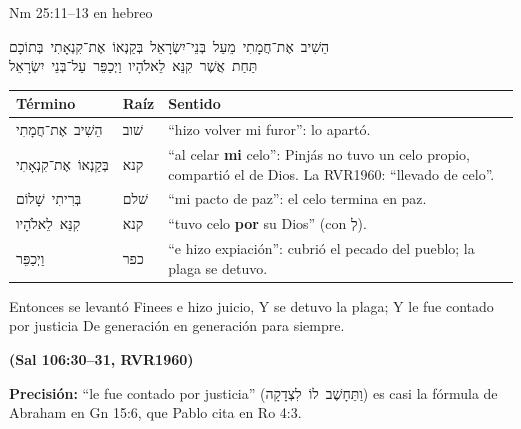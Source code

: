 \documentclass[hyperref={bookmarks=false},aspectratio=169]{beamer}
\newcommand{\heb}[1]{\mbox{\foreignlanguage{hebrew}{#1}}}
\newcommand{\fuente}[1]{\par\hfill{\upshape\bfseries\footnotesize\textcolor{azul}{#1}}}
\newcommand{\destacar}[1]{\textbf{\textcolor{azul}{#1}}}
\newcommand{\precision}[1]{{\footnotesize\color{gris}\textbf{Precisión:} #1}}
\begin{document}
\begin{frame}{Nm 25:11--13 en hebreo}
\begin{center}\heb{הֵשִׁיב אֶת־חֲמָתִי מֵעַל בְּנֵי־יִשְׂרָאֵל בְּקַנְאוֹ אֶת־קִנְאָתִי בְּתוֹכָם}\\[2pt]\heb{תַּחַת אֲשֶׁר קִנֵּא לֵאלֹהָיו וַיְכַפֵּר עַל־בְּנֵי יִשְׂרָאֵל}\end{center}
\scriptsize\renewcommand{\arraystretch}{1.13}
\begin{tabular}{@{}>{\RaggedRight\arraybackslash}p{3.1cm}>{\RaggedRight\arraybackslash}p{1.1cm}>{\RaggedRight\arraybackslash}p{7.6cm}@{}}
\toprule
\textbf{Término} & \textbf{Raíz} & \textbf{Sentido} \\ \midrule
\heb{הֵשִׁיב אֶת־חֲמָתִי} & \heb{שׁוב} & ``hizo volver mi furor'': lo apartó. \\
\heb{בְּקַנְאוֹ אֶת־קִנְאָתִי} & \heb{קנא} & ``al celar \destacar{mi} celo'': Pinjás no tuvo un celo propio, compartió el de Dios. La RVR1960: ``llevado de celo''. \\
\heb{בְּרִיתִי שָׁלוֹם} & \heb{שׁלם} & ``mi pacto de paz'': el celo termina en paz. \\
\heb{קִנֵּא לֵאלֹהָיו} & \heb{קנא} & ``tuvo celo \destacar{por} su Dios'' (con \heb{לְ}). \\
\heb{וַיְכַפֵּר} & \heb{כפר} & ``e hizo expiación'': cubrió el pecado del pueblo; la plaga se detuvo. \\
\bottomrule
\end{tabular}\par\medskip
\begin{cita}Entonces se levantó Finees e hizo juicio, Y se detuvo la plaga; Y le fue contado por justicia De generación en generación para siempre.\fuente{(Sal 106:30--31, RVR1960)}\end{cita}
\precision{``le fue contado por justicia'' (\heb{וַתֵּחָשֶׁב לוֹ לִצְדָקָה}) es casi la fórmula de Abraham en Gn 15:6, que Pablo cita en Ro 4:3.}
\end{frame}
\end{document}
